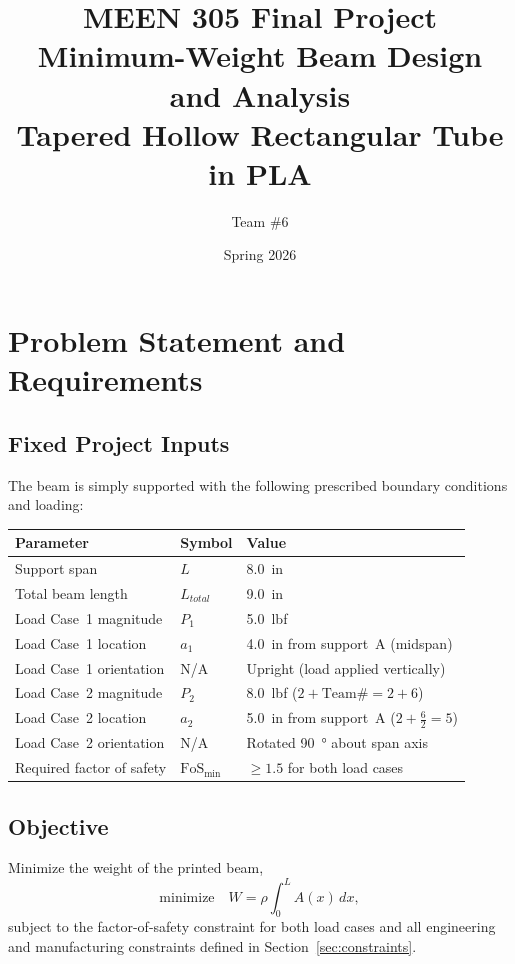 \documentclass[11pt,letterpaper]{article}
\title{\textbf{MEEN 305 Final Project}\\[0.5em]
       \large Minimum-Weight Beam Design and Analysis\\[0.3em]
       \large Tapered Hollow Rectangular Tube in PLA}
\author{Team \#6}
\date{Spring 2026}
\begin{document}
\maketitle
\tableofcontents
\newpage

\section{Problem Statement and Requirements}

\subsection{Fixed Project Inputs}

The beam is simply supported with the following prescribed boundary conditions
and loading:

\begin{center}
\begin{tabular}{lll}
\toprule
Parameter & Symbol & Value \\
\midrule
Support span & $L$ & \SI{8.0}{in} \\
Total beam length & $L_{total}$ & \SI{9.0}{in} \\
Load Case~1 magnitude & $P_1$ & \SI{5.0}{lbf} \\
Load Case~1 location & $a_1$ & \SI{4.0}{in} from support~A (midspan) \\
Load Case~1 orientation & N/A & Upright (load applied vertically) \\
Load Case~2 magnitude & $P_2$ & \SI{8.0}{lbf} \quad ($2 + \text{Team\#} = 2 + 6$) \\
Load Case~2 location & $a_2$ & \SI{5.0}{in} from support~A \quad ($2 + \tfrac{6}{2} = 5$) \\
Load Case~2 orientation & N/A & Rotated \SI{90}{\degree} about span axis \\
Required factor of safety & $\mathrm{FoS}_{\min}$ & $\ge 1.5$ for both load cases \\
\bottomrule
\end{tabular}
\end{center}

\subsection{Objective}

Minimize the weight of the printed beam,
\[
  \text{minimize}\quad W = \rho \int_0^{L} A(x)\,dx,
\]
subject to the factor-of-safety constraint for both load cases and all
engineering and manufacturing constraints defined in Section~\ref{sec:constraints}.
\end{document}
